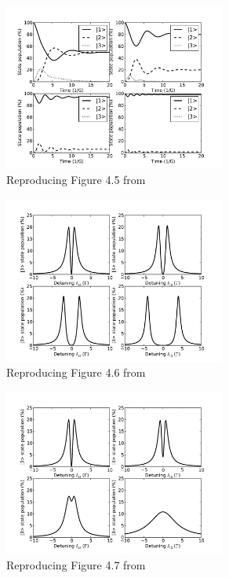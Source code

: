 \documentclass{article}
\begin{document}
\begin{spacing}{1.1}
\begin{figure}
\begin{center}
\includegraphics[width=0.65\textwidth]{figures/matt45.pdf}
\caption{Reproducing Figure 4.5 from \cite{McDonnell2003}}
\label{fig:matt45}
\end{center}
\end{figure}

\begin{figure}
\begin{center}
\includegraphics[width=0.65\textwidth]{figures/matt46.pdf}
\caption{Reproducing Figure 4.6 from \cite{McDonnell2003}}
\label{fig:matt46}
\end{center}
\end{figure}

\begin{figure}
\begin{center}
\includegraphics[width=0.65\textwidth]{figures/matt47.pdf}
\caption{Reproducing Figure 4.7 from \cite{McDonnell2003}}
\label{fig:matt47}
\end{center}
\end{figure}


\end{spacing}
\end{document}
